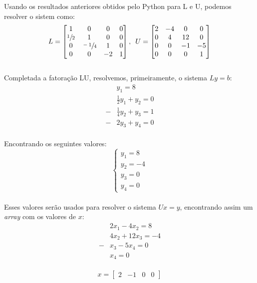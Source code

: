Usando os resultados anteriores obtidos pelo Python para L e U, podemos resolver o sistem como:
\\

\[
    L = \begin{bmatrix}
        1            & 0             & 0  & 0 \\
        \sfrac{1}{2} & 1             & 0  & 0 \\
        0            & \sfrac{-1}{4} & 1  & 0 \\
        0            & 0             & -2 & 1
    \end{bmatrix}, \hspace{.5em}
    U = \begin{bmatrix}
        2 & -4 & 0  & 0  \\
        0 & 4  & 12 & 0  \\
        0 & 0  & -1 & -5 \\
        0 & 0  & 0  & 1
    \end{bmatrix}
\]
\\

Completada a fatoração LU, resolvemos, primeiramente, o sistema $Ly=b$:
\\

\[
    \begin{aligned}
          & y_1 = 8                  \\
          & \frac{1}{2}y_1 + y_2 = 0 \\
        - & \frac{1}{4}y_2+y_3 = 1   \\
        - & 2y_3+y_4 = 0
    \end{aligned}
\]
\\

Encontrando os seguintes valores:
\\

\[
    \begin{cases}
        y_1 = 8  \\
        y_2 = -4 \\
        y_3 = 0  \\
        y_4 = 0
    \end{cases}
\]
\\

Esses valores serão usados para resolver o sistema $Ux=y$, encontrando assim um \textit{array} com os valores de $x$:
\\

\[
    \begin{aligned}
          & 2x_1 - 4x_2= 8    \\
          & 4x_2 + 12x_3 = -4 \\
        - & x_3 - 5x_4 = 0    \\
          & x_4  = 0
    \end{aligned}
\]
\\

\begin{equation}
    x =\begin{bmatrix}
        2 & -1 & 0 & 0
    \end{bmatrix}
\end{equation}
\\
